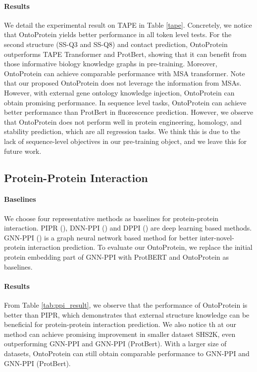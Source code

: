 \paragraph{Results}
We detail the experimental result on TAPE in Table \ref{tape}.
Concretely, we notice that OntoProtein yields better performance in all token level tests.
For the second structure (SS-Q3 and SS-Q8) and contact prediction, OntoProtein outperforms TAPE Transformer and ProtBert, showing that it can benefit from those informative biology knowledge graphs in pre-training.
Moreover, OntoProtein can achieve comparable performance with MSA transformer.
Note that our proposed OntoProtein does not leverage the information from MSAs.
However, with external gene ontology knowledge injection, OntoProtein can obtain promising performance.
In sequence level tasks, OntoProtein can achieve better performance than ProtBert in fluorescence prediction. 
However, we observe that OntoProtein does not perform well in protein engineering, homology, and stability prediction, which are all regression tasks.
We think this is due to the lack of sequence-level objectives in our pre-training object, and we leave this for future work.

\subsection*{Protein-Protein Interaction}
\paragraph{Baselines}
We choose four representative methods as baselines for protein-protein interaction.
PIPR (\cite{DBLP:journals/bioinformatics/ChenJZCZCZW19}), {\color{highlight} DNN-PPI (\cite{li2018deep}) and DPPI (\cite{DBLP:journals/bioinformatics/HashemifarNKX18})} are  deep learning based methods.
GNN-PPI (\cite{DBLP:conf/ijcai/LvHBZ21}) is a graph neural network based method for better inter-novel-protein interaction prediction.
To evaluate our OntoProtein, we replace the initial protein embedding part of GNN-PPI with ProtBERT and OntoProtein as baselines.

\paragraph{Results}

From Table \ref{tab:ppi_result}, we observe that the performance of OntoProtein is better than PIPR, which demonstrates that external structure knowledge can be beneficial for protein-protein interaction prediction. 
We also notice th         at our method can achieve promising improvement in smaller dataset SHS2K, even outperforming GNN-PPI and GNN-PPI (ProtBert).
With a larger size of datasets, OntoProtein can still obtain comparable performance to GNN-PPI and GNN-PPI (ProtBert).

